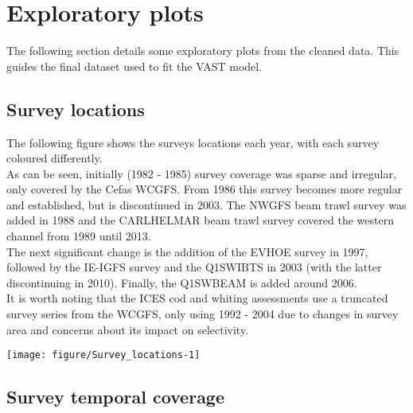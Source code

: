 \documentclass[12pt]{article}\usepackage[]{graphicx}\usepackage[]{color}
\newenvironment{knitrout}{}{} %
\begin{document}
\section{Exploratory plots}

The following section details some exploratory plots from the cleaned data.
This guides the final dataset used to fit the VAST model.




\subsection{Survey locations}

The following figure shows the surveys locations each year, with each survey
coloured differently.\\

As can be seen, initially (1982 - 1985) survey coverage was sparse and
irregular, only covered by the Cefas WCGFS. From 1986 this survey becomes more
regular and established, but is discontinued in 2003. The NWGFS beam trawl
survey was added in 1988 and the CARLHELMAR beam trawl survey covered the
western channel from 1989 until 2013.\\

The next significant change is the addition of the EVHOE survey in 1997,
followed by the IE-IGFS survey and the Q1SWIBTS in 2003 (with the latter
discontinuing in 2010). Finally, the Q1SWBEAM is added around 2006. \\

It is worth noting that the ICES cod and whiting assessments use a truncated
survey series from the WCGFS, only using 1992 - 2004 due to changes in survey
area and concerns about its impact on selectivity. \\

\begin{landscape}

\begin{knitrout}\footnotesize
{}\color{fgcolor}
\texttt{[image: figure/Survey\_locations-1]} 

\end{knitrout}

\end{landscape}

\subsection{Survey temporal coverage}
\end{document}
